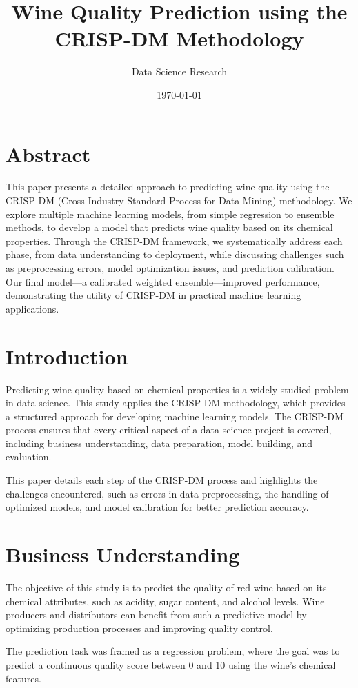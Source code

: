 \documentclass{article}
\title{Wine Quality Prediction using the CRISP-DM Methodology}
\author{Data Science Research}
\date{\today}
\begin{document}
\maketitle

\section*{Abstract}
This paper presents a detailed approach to predicting wine quality using the CRISP-DM (Cross-Industry Standard Process for Data Mining) methodology. We explore multiple machine learning models, from simple regression to ensemble methods, to develop a model that predicts wine quality based on its chemical properties. Through the CRISP-DM framework, we systematically address each phase, from data understanding to deployment, while discussing challenges such as preprocessing errors, model optimization issues, and prediction calibration. Our final model—a calibrated weighted ensemble—improved performance, demonstrating the utility of CRISP-DM in practical machine learning applications.

\section{Introduction}
Predicting wine quality based on chemical properties is a widely studied problem in data science. This study applies the CRISP-DM methodology, which provides a structured approach for developing machine learning models. The CRISP-DM process ensures that every critical aspect of a data science project is covered, including business understanding, data preparation, model building, and evaluation.

This paper details each step of the CRISP-DM process and highlights the challenges encountered, such as errors in data preprocessing, the handling of optimized models, and model calibration for better prediction accuracy.

\section{Business Understanding}
The objective of this study is to predict the quality of red wine based on its chemical attributes, such as acidity, sugar content, and alcohol levels. Wine producers and distributors can benefit from such a predictive model by optimizing production processes and improving quality control.

The prediction task was framed as a regression problem, where the goal was to predict a continuous quality score between 0 and 10 using the wine’s chemical features.
\end{document}
